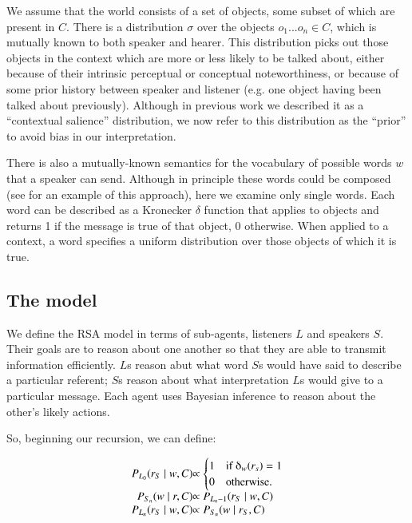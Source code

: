 \documentclass[man,noapacite]{apa2}
\begin{document}
We assume that the world consists of a set of objects, some subset of which are present in $C$. There is a distribution $\sigma$ over the objects ${o_1 ... o_n} \in C$, which is mutually known to both speaker and hearer. This distribution picks out those objects in the context which are more or less likely to be talked about, either because of their intrinsic perceptual or conceptual noteworthiness, or because of some prior history between speaker and listener (e.g. one object having been talked about previously). Although in previous work we described it as a ``contextual salience'' distribution, we now refer to this distribution as the ``prior'' to avoid bias in our interpretation.

There is also a mutually-known semantics for the vocabulary of possible words $w$ that a speaker can send. Although in principle these words could be composed (see  for an example of this approach), here we examine only single words. Each word can be described as a Kronecker $\delta$ function that applies to objects and returns 1 if the message is true of that object, 0 otherwise. When applied to a context, a word specifies a uniform distribution over those objects of which it is true.

\subsection{The model}

We define the RSA model in terms of sub-agents, listeners $L$ and speakers $S$. Their goals are to reason about one another so that they are able to transmit information efficiently. $L$s reason abut what word $S$s would have said to describe a particular referent; $S$s reason about what interpretation $L$s would give to a particular message. Each agent uses Bayesian inference to reason about the other's likely actions.

So, beginning our recursion, we can define:

\begin{equation}
  \begin{array}{r@{}l}
    \label{eq:agents}
    P_{L_0}(r_S \mid w, C) & \propto \begin{cases} 1 &\mbox{if } \delta_w(r_s) = 1 \\
0 & \mbox{otherwise.} \end{cases} \\
    P_{S_n}(w \mid r, C) & \propto P_{L_n-1} (r_S \mid w, C)  \\
    P_{L_n}(r_S \mid w, C) & \propto P_{S_n} (w \mid r_S, C)\\
  \end{array}
\end{equation}
\end{document}
